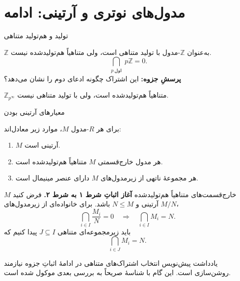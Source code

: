 \section{مدول‌های نوتری و آرتینی: ادامه}

\begin{frame}[t]{تولید و هم‌تولید متناهی}
    \label{lec11:fg-fc-examples}
    \begin{example}
        $\mathbb Z$ به‌عنوان $\mathbb Z$-مدول با تولید متناهی است،
        ولی متناهیاً هم‌تولیدشده نیست.
        \[
            \bigcap_{\substack{p\ \text{اول}}}p\mathbb Z=0.
        \]
        \textbf{پرسشِ جزوه:} این اشتراک چگونه ادعای دوم را نشان می‌دهد؟
    \end{example}
    \begin{example}
        $\mathbb Z_{p^\infty}$ متناهیاً هم‌تولیدشده است،
        ولی با تولید متناهی نیست.
    \end{example}
\end{frame}

\begin{frame}[t]{معیارهای آرتینی بودن}
    \label{lec11:artinian-criteria}
    \begin{theorem}
        برای هر $R$-مدول $M$، موارد زیر معادل‌اند:
        \begin{enumerate}
            \item $M$ آرتینی است.
            \item هر مدول خارج‌قسمتی $M$ متناهیاً هم‌تولیدشده است.
            \item هر مجموعهٔ ناتهی از زیرمدول‌های $M$ دارای عنصر مینیمال است.
        \end{enumerate}
    \end{theorem}
\end{frame}

\begin{frame}[t]{خارج‌قسمت‌های متناهیاً هم‌تولیدشده}
    \label{lec11:artinian-to-fc}
    \textbf{آغاز اثباتِ شرط ۱ به شرط ۲.}
    فرض کنید $M$ آرتینی و $N\leqslant M$ باشد. برای خانواده‌ای از زیرمدول‌های $M/N$،
    \[
        \bigcap_{i\in I}\frac{M_i}{N}=0
        \quad\Longrightarrow\quad
        \bigcap_{i\in I}M_i=N.
    \]
    باید زیرمجموعه‌ای متناهی $J\subseteq I$ پیدا کنیم که
    \[
        \bigcap_{i\in J}M_i=N.
    \]
    \begin{tblock}{یادداشت پیش‌نویس}
        انتخاب اشتراک‌های متناهی در ادامهٔ اثباتِ جزوه نیازمند روشن‌سازی است.
        این گام با شناسهٔ  صریحاً به بررسی بعدی موکول شده است.
    \end{tblock}
\end{frame}

